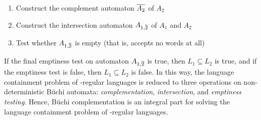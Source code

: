 \begin{enumerate}
\item Construct the complement automaton $\cl1{A_2}$ of $A_2$
\item Construct the intersection automaton $A_{1,\cl1{2}}$ of $A_1$ and $A_2$
\item Test whether $A_{1,\cl1{2}}$ is empty (that is, accepts no words at all)
\end{enumerate}

If the final emptiness test on automaton $A_{1,\cl1{2}}$ is true, then $L_1 \subseteq L_2$ is true, and if the emptiness test is false, then $L_1 \subseteq L_2$ is false. In this way, the language containment problem of \om-regular languages is reduced to three operations on non-deterministic Büchi automata: \textit{complementation}, \textit{intersection}, and \textit{emptiness testing}. Hence, Büchi complementation is an integral part for solving the language containment problem of \om-regular languages.





